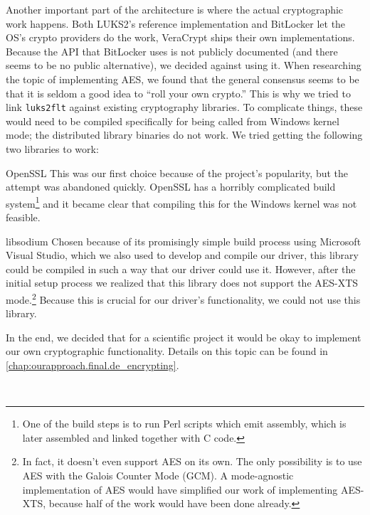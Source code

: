 Another important part of the architecture is where the actual cryptographic work happens. Both LUKS2's reference implementation and BitLocker let the OS's crypto providers do the work, VeraCrypt ships their own implementations. Because the API that BitLocker uses is not publicly documented (and there seems to be no public alternative), we decided against using it. When researching the topic of implementing AES, we found that the general consensus seems to be that it is seldom a good idea to ``roll your own crypto.'' This is why we tried to link \texttt{luks2flt} against existing cryptography libraries. To complicate things, these would need to be compiled specifically for being called from Windows kernel mode; the distributed library binaries do not work. We tried getting the following two libraries to work:
\begin{descitemize}
	\item[OpenSSL] This was our first choice because of the project's popularity, but the attempt was abandoned quickly. OpenSSL has a horribly complicated build system\footnote{\label{fn:ourapproach.final.opensslbuild} One of the build steps is to run Perl scripts which emit assembly, which is later assembled and linked together with C code.} and it became clear that compiling this for the Windows kernel was not feasible.
	\item[libsodium] Chosen because of its promisingly simple build process using Microsoft Visual Studio, which we also used to develop and compile our driver, this library could be compiled in such a way that our driver could use it. However, after the initial setup process we realized that this library does not support the AES-XTS mode.\footnote{\label{fn:ourapproach.final.libsodium} In fact, it doesn't even support AES on its own. The only possibility is to use AES with the Galois Counter Mode (GCM). A mode-agnostic implementation of AES would have simplified our work of implementing AES-XTS, because half of the work would have been done already.} Because this is crucial for our driver's functionality, we could not use this library.
\end{descitemize}

In the end, we decided that for a scientific project it would be okay to implement our own cryptographic functionality. Details on this topic can be found in \autoref{chap:ourapproach.final.de_encrypting}.

\\

